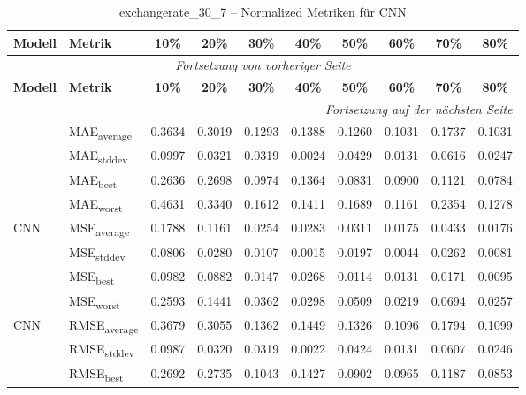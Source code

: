 {\small
\begin{longtable}{l l c c c c c c c c}
    \toprule
    \textbf{Modell} & \textbf{Metrik} & \textbf{10\%} & \textbf{20\%} & \textbf{30\%} & \textbf{40\%} & \textbf{50\%} & \textbf{60\%} & \textbf{70\%} & \textbf{80\%} \\
    \midrule
    \endfirsthead
    \multicolumn{10}{c}{\textit{Fortsetzung von vorheriger Seite}} \\
    \toprule
    \textbf{Modell} & \textbf{Metrik} & \textbf{10\%} & \textbf{20\%} & \textbf{30\%} & \textbf{40\%} & \textbf{50\%} & \textbf{60\%} & \textbf{70\%} & \textbf{80\%} \\
    \midrule
    \endhead
    \midrule
    \multicolumn{10}{r}{\textit{Fortsetzung auf der nächsten Seite}} \\
    \midrule
    \endfoot
    \bottomrule
    \caption{exchangerate_30_7 -- Normalized Metriken für CNN}
    \label{tab:exchangerate_30_7_normalized_cnn}
    \endlastfoot
\multirow{4}{*}{CNN} & MAE\textsubscript{average} & 0.3634 & 0.3019 & 0.1293 & 0.1388 & 0.1260 & 0.1031 & 0.1737 & 0.1031 \\
 & MAE\textsubscript{stddev} & 0.0997 & 0.0321 & 0.0319 & 0.0024 & 0.0429 & 0.0131 & 0.0616 & 0.0247 \\
 & MAE\textsubscript{best} & 0.2636 & 0.2698 & 0.0974 & 0.1364 & 0.0831 & 0.0900 & 0.1121 & 0.0784 \\
 & MAE\textsubscript{worst} & 0.4631 & 0.3340 & 0.1612 & 0.1411 & 0.1689 & 0.1161 & 0.2354 & 0.1278 \\
\cmidrule(lr){2-10}
\multirow{4}{*}{CNN} & MSE\textsubscript{average} & 0.1788 & 0.1161 & 0.0254 & 0.0283 & 0.0311 & 0.0175 & 0.0433 & 0.0176 \\
 & MSE\textsubscript{stddev} & 0.0806 & 0.0280 & 0.0107 & 0.0015 & 0.0197 & 0.0044 & 0.0262 & 0.0081 \\
 & MSE\textsubscript{best} & 0.0982 & 0.0882 & 0.0147 & 0.0268 & 0.0114 & 0.0131 & 0.0171 & 0.0095 \\
 & MSE\textsubscript{worst} & 0.2593 & 0.1441 & 0.0362 & 0.0298 & 0.0509 & 0.0219 & 0.0694 & 0.0257 \\
\cmidrule(lr){2-10}
\multirow{4}{*}{CNN} & RMSE\textsubscript{average} & 0.3679 & 0.3055 & 0.1362 & 0.1449 & 0.1326 & 0.1096 & 0.1794 & 0.1099 \\
 & RMSE\textsubscript{stddev} & 0.0987 & 0.0320 & 0.0319 & 0.0022 & 0.0424 & 0.0131 & 0.0607 & 0.0246 \\
 & RMSE\textsubscript{best} & 0.2692 & 0.2735 & 0.1043 & 0.1427 & 0.0902 & 0.0965 & 0.1187 & 0.0853 \\

\end{longtable}}
